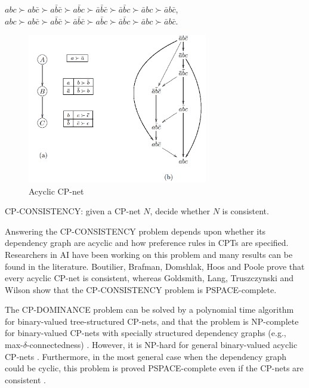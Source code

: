 \begin{center}
	$abc \succ ab\bar{c} \succ a\bar{b}\bar{c} \succ a\bar{b}c \succ \bar{a}\bar{b}\bar{c} 
		\succ \bar{a}\bar{b}c \succ \bar{a}bc \succ \bar{a}b\bar{c}$,\\
	$abc \succ ab\bar{c} \succ a\bar{b}\bar{c} \succ \bar{a}\bar{b}\bar{c} \succ a\bar{b}c
		\succ \bar{a}\bar{b}c \succ \bar{a}bc \succ \bar{a}b\bar{c}$.
\end{center}

\begin{figure}[h!]
  \centering
  \includegraphics[width=0.7\textwidth]{img/acpn.png}
  \caption{Acyclic CP-net \label{fig:cp_net}}
\end{figure}



\begin{definition}
\label{def:con}
  CP-CONSISTENCY: given a CP-net $N$, decide whether 
	$N$ is consistent.
\end{definition}

Answering the CP-CONSISTENCY problem depends upon whether
its dependency graph are acyclic and how preference rules
in CPTs are specified.
Researchers in AI have been working on this problem
and many results can be found in the literature.
Boutilier, Brafman, Domshlak, Hoos and Poole \cite{bbdh03} 
prove that every acyclic CP-net
is consistent, whereas Goldsmith, Lang, Truszczynski and Wilson \cite{Goldsmith} show
that the CP-CONSISTENCY problem is PSPACE-complete.



The CP-DOMINANCE problem can be solved by
a polynomial time algorithm for binary-valued tree-structured
CP-nets, and that the problem is NP-complete for binary-valued
CP-nets with specially structured dependency graphs 
(e.g., max-$\delta$-connectedness) \cite{bbdh03}.
However, it is NP-hard for general binary-valued acyclic 
CP-nets \cite{bbdh03}.
Furthermore, in the most general case when the dependency graph
could be cyclic, this problem is proved PSPACE-complete even
if the CP-nets are consistent \cite{Goldsmith}.

